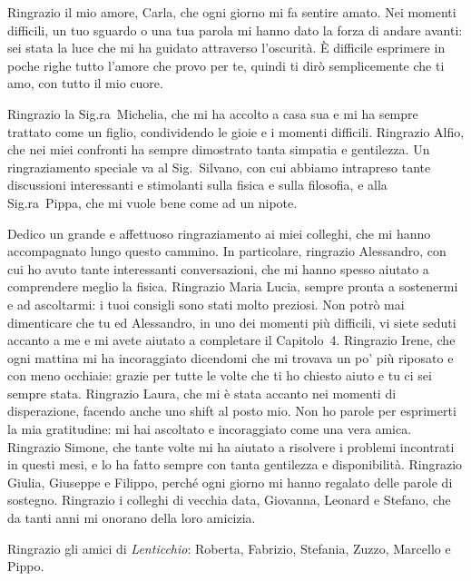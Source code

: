 Ringrazio il mio amore, Carla, che ogni giorno mi fa sentire amato.
Nei momenti difficili, un tuo sguardo o una tua parola mi hanno dato la forza di andare avanti: sei stata la luce che mi ha guidato attraverso l'oscurità.
È difficile esprimere in poche righe tutto l'amore che provo per te, quindi ti dirò semplicemente che ti amo, con tutto il mio cuore.


Ringrazio la Sig.ra~Michelia, che mi ha accolto a casa sua e mi ha sempre trattato come un figlio, condividendo le gioie e i momenti difficili.
Ringrazio Alfio, che nei miei confronti ha sempre dimostrato tanta simpatia e gentilezza.
Un ringraziamento speciale va al Sig.~Silvano, con cui abbiamo intrapreso tante discussioni interessanti e stimolanti sulla fisica e sulla filosofia, e alla Sig.ra~Pippa, che mi vuole bene come ad un nipote.


Dedico un grande e affettuoso ringraziamento ai miei colleghi, che mi hanno accompagnato lungo questo cammino.
In particolare, ringrazio Alessandro, con cui ho avuto tante interessanti conversazioni, che mi hanno spesso aiutato a comprendere meglio la fisica.
Ringrazio Maria Lucia, sempre pronta a sostenermi e ad ascoltarmi: i tuoi consigli sono stati molto preziosi.
Non potrò mai dimenticare che tu ed Alessandro, in uno dei momenti più difficili, vi siete seduti accanto a me e mi avete aiutato a completare il Capitolo~4.
Ringrazio Irene, che ogni mattina mi ha incoraggiato dicendomi che mi trovava un po' più riposato e con meno occhiaie: grazie per tutte le volte che ti ho chiesto aiuto e tu ci sei sempre stata.
Ringrazio Laura, che mi è stata accanto nei momenti di disperazione, facendo anche uno shift al posto mio.
Non ho parole per esprimerti la mia gratitudine: mi hai ascoltato e incoraggiato come una vera amica.
Ringrazio Simone, che tante volte mi ha aiutato a risolvere i problemi incontrati in questi mesi, e lo ha fatto sempre con tanta gentilezza e disponibilità.
Ringrazio Giulia, Giuseppe e Filippo, perché ogni giorno mi hanno regalato delle parole di sostegno.
Ringrazio i colleghi di vecchia data, Giovanna, Leonard e Stefano, che da tanti anni mi onorano della loro amicizia.

Ringrazio gli amici di \emph{Lenticchio}: Roberta, Fabrizio, Stefania, Zuzzo, Marcello e Pippo. 



